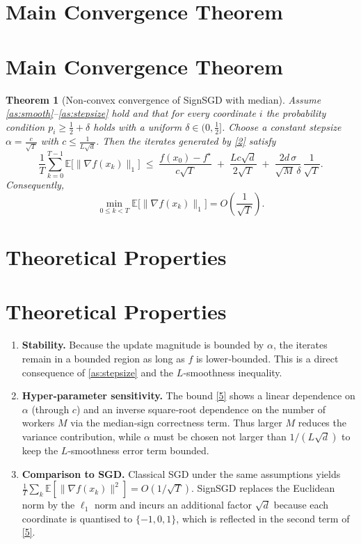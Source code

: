 \documentclass{article}
\newtheorem{theorem}{Theorem}
\newcommand{\E}{\mathbb{E}}
\begin{document}
\section*{Main Convergence Theorem}
\section{Main Convergence Theorem}
\begin{theorem}[Non‑convex convergence of SignSGD with median]\label{thm:main}
Assume \ref{as:smooth}–\ref{as:stepsize} hold and that for every
coordinate $i$ the probability condition $p_i\ge \tfrac12+\delta$
holds with a uniform $\delta\in(0,\tfrac12]$.  Choose a constant stepsize
$\alpha = \frac{c}{\sqrt{T}}$ with $c\le \frac{1}{L\sqrt{d}}$.
Then the iterates generated by \eqref{2} satisfy
\[
\frac{1}{T}\sum_{k=0}^{T-1}\E\!\big[\|\nabla f(x_k)\|_{1}\big]
\;\le\;
\frac{f(x_0)-f^{\star}}{c\sqrt{T}}
\;+\;
\frac{L c\sqrt{d}}{2\sqrt{T}}
\;+\;
\frac{2d\,\sigma}{\sqrt{M}\,\delta}\,\frac{1}{\sqrt{T}}.
\tag{5}
\]
Consequently,
\[
\min_{0\le k<T}\E\!\big[\|\nabla f(x_k)\|_{1}\big]
= O\!\left(\frac{1}{\sqrt{T}}\right).
\]
\end{theorem}

\section*{Theoretical Properties}
\section{Theoretical Properties}
\begin{enumerate}[label=\arabic*.]
\item \textbf{Stability.} Because the update magnitude is bounded
      by $\alpha$, the iterates remain in a bounded region as long as
      $f$ is lower‑bounded.  This is a direct consequence of
      \ref{as:stepsize} and the $L$‑smoothness inequality.
\item \textbf{Hyper‑parameter sensitivity.}
      The bound \eqref{5} shows a linear dependence on $\alpha$ (through
      $c$) and an inverse square‑root dependence on the number of workers
      $M$ via the median‑sign correctness term.  Thus larger $M$ reduces
      the variance contribution, while $\alpha$ must be chosen not larger
      than $1/(L\sqrt{d})$ to keep the $L$‑smoothness error term bounded.
\item \textbf{Comparison to SGD.}
      Classical SGD under the same assumptions yields
      $\frac{1}{T}\sum_{k}\E[\|\nabla f(x_k)\|^{2}]=O(1/\sqrt{T})$.
      SignSGD replaces the Euclidean norm by the $\ell_{1}$ norm and
      incurs an additional factor $\sqrt{d}$ because each coordinate is
      quantised to $\{-1,0,1\}$, which is reflected in the second term of
      \eqref{5}.
\end{enumerate}
\end{document}
